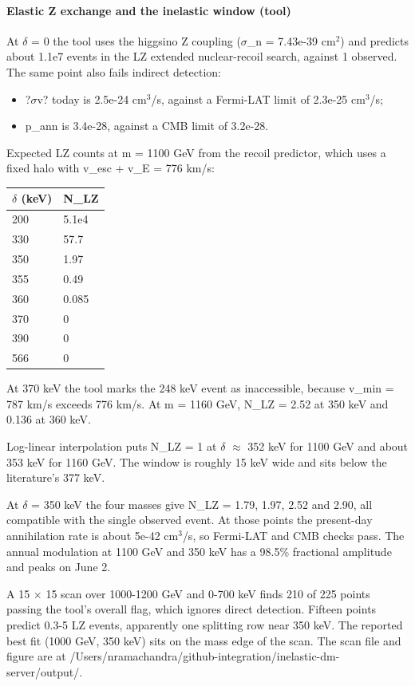 \documentclass[11pt,a4paper]{article}
\begin{document}
\paragraph{Elastic Z exchange and the inelastic window (tool)}
At $\delta$ = 0 the tool uses the higgsino Z coupling ($\sigma$\_n = 7.43e-39 cm$^2$) and predicts about 1.1e7 events in the LZ extended nuclear-recoil search, against 1 observed. The same point also fails indirect detection:

\begin{itemize}
  \item ?$\sigma$v? today is 2.5e-24 cm$^3$/s, against a Fermi-LAT limit of 2.3e-25 cm$^3$/s;
  \item p\_ann is 3.4e-28, against a CMB limit of 3.2e-28.
\end{itemize}
Expected LZ counts at m = 1100 GeV from the recoil predictor, which uses a fixed halo with v\_esc + v\_E = 776 km/s:

\begin{longtable}{@{}p{}p{}@{}}
\toprule
\textbf{$\delta$ (keV)} & \textbf{N\_LZ} \\ \midrule \endhead
200 & 5.1e4 \\
330 & 57.7 \\
350 & 1.97 \\
355 & 0.49 \\
360 & 0.085 \\
370 & 0 \\
390 & 0 \\
566 & 0 \\
\bottomrule\end{longtable}
At 370 keV the tool marks the 248 keV event as inaccessible, because v\_min = 787 km/s exceeds 776 km/s. At m = 1160 GeV, N\_LZ = 2.52 at 350 keV and 0.136 at 360 keV.

Log-linear interpolation puts N\_LZ = 1 at $\delta$ $\approx$ 352 keV for 1100 GeV and about 353 keV for 1160 GeV. The window is roughly 15 keV wide and sits below the literature's 377 keV.

At $\delta$ = 350 keV the four masses give N\_LZ = 1.79, 1.97, 2.52 and 2.90, all compatible with the single observed event. At those points the present-day annihilation rate is about 5e-42 cm$^3$/s, so Fermi-LAT and CMB checks pass. The annual modulation at 1100 GeV and 350 keV has a 98.5\% fractional amplitude and peaks on June 2.

A 15 $\times$ 15 scan over 1000-1200 GeV and 0-700 keV finds 210 of 225 points passing the tool's overall flag, which ignores direct detection. Fifteen points predict 0.3-5 LZ events, apparently one splitting row near 350 keV. The reported best fit (1000 GeV, 350 keV) sits on the mass edge of the scan. The scan file and figure are at /Users/nramachandra/github-integration/inelastic-dm-server/output/.
\end{document}
